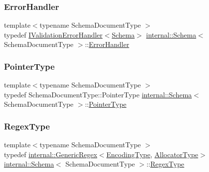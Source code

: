 \mbox{\label{classinternal_1_1Schema_a2f8b106324878cdfc614df855e8bc6cc}} 
\subsubsection{\texorpdfstring{Error\+Handler}{ErrorHandler}}
{\footnotesize\ttfamily template$<$typename Schema\+Document\+Type $>$ \\
typedef \hyperlink{classinternal_1_1IValidationErrorHandler}{I\+Validation\+Error\+Handler}$<$\hyperlink{classinternal_1_1Schema}{Schema}$>$ \hyperlink{classinternal_1_1Schema}{internal\+::\+Schema}$<$ Schema\+Document\+Type $>$\+::\hyperlink{classinternal_1_1Schema_a2f8b106324878cdfc614df855e8bc6cc}{Error\+Handler}}

\mbox{\label{classinternal_1_1Schema_a13d7dbba6e4a77b10862546777c5aae8}} 
\subsubsection{\texorpdfstring{Pointer\+Type}{PointerType}}
{\footnotesize\ttfamily template$<$typename Schema\+Document\+Type $>$ \\
typedef Schema\+Document\+Type\+::\+Pointer\+Type \hyperlink{classinternal_1_1Schema}{internal\+::\+Schema}$<$ Schema\+Document\+Type $>$\+::\hyperlink{classinternal_1_1Schema_a13d7dbba6e4a77b10862546777c5aae8}{Pointer\+Type}}

\mbox{\label{classinternal_1_1Schema_a78fd42fda3cecdad0ee56559b4e3cec6}} 
\subsubsection{\texorpdfstring{Regex\+Type}{RegexType}}
{\footnotesize\ttfamily template$<$typename Schema\+Document\+Type $>$ \\
typedef \hyperlink{classinternal_1_1GenericRegex}{internal\+::\+Generic\+Regex}$<$\hyperlink{classinternal_1_1Schema_a9ea269c3ca8099c2a14b6519fe34efb1}{Encoding\+Type}, \hyperlink{classinternal_1_1Schema_a7af392edd81e610754cd2e6b4f82761c}{Allocator\+Type}$>$ \hyperlink{classinternal_1_1Schema}{internal\+::\+Schema}$<$ Schema\+Document\+Type $>$\+::\hyperlink{classinternal_1_1Schema_a78fd42fda3cecdad0ee56559b4e3cec6}{Regex\+Type}\hspace{0.3cm}{\ttfamily [private]}}

